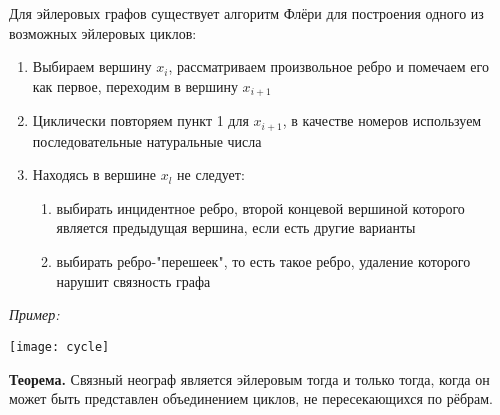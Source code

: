 \documentclass[10pt]{article}
\begin{document}
\par Для эйлеровых графов существует алгоритм Флёри для построения одного из возможных эйлеровых циклов:
\begin{enumerate}
    \item Выбираем вершину $x_{i}$, рассматриваем произвольное ребро и помечаем его как первое, переходим в вершину $x_{i + 1}$
    \item Циклически повторяем пункт 1 для $x_{i + 1}$, в качестве номеров используем последовательные натуральные числа
    \item Находясь в вершине $x_l$ не следует:
        \begin{enumerate}
            \item выбирать инцидентное ребро, второй концевой вершиной которого является предыдущая вершина, если есть другие варианты
            \item выбирать ребро-"перешеек", то есть такое ребро, удаление которого нарушит связность графа
        \end{enumerate}
\end{enumerate}
\par\textit{Пример:}
\begin{center}
    \texttt{[image: cycle]}
\end{center}

\par\textbf{Теорема.} Связный неограф является эйлеровым тогда и только тогда, когда он может быть представлен объединением циклов, не пересекающихся по рёбрам.

\end{document}
